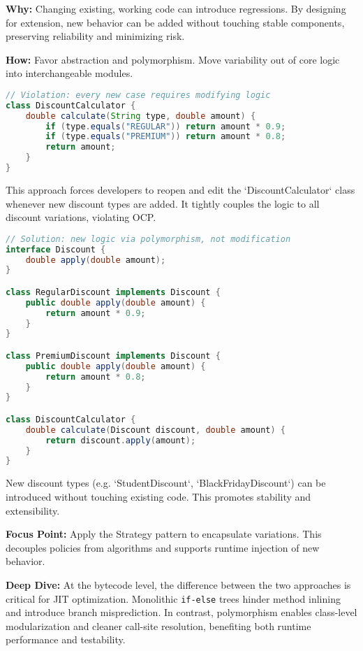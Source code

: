 \documentclass[a4paper,12pt]{article}
\begin{document}
\textbf{Why:} Changing existing, working code can introduce regressions. By designing for extension, new behavior can be added without touching stable components, preserving reliability and minimizing risk.

\textbf{How:} Favor abstraction and polymorphism. Move variability out of core logic into interchangeable modules.

\begin{lstlisting}[language=Java]
// Violation: every new case requires modifying logic
class DiscountCalculator {
    double calculate(String type, double amount) {
        if (type.equals("REGULAR")) return amount * 0.9;
        if (type.equals("PREMIUM")) return amount * 0.8;
        return amount;
    }
}
\end{lstlisting}

This approach forces developers to reopen and edit the `DiscountCalculator` class whenever new discount types are added. It tightly couples the logic to all discount variations, violating OCP.

\begin{lstlisting}[language=Java]
// Solution: new logic via polymorphism, not modification
interface Discount {
    double apply(double amount);
}

class RegularDiscount implements Discount {
    public double apply(double amount) {
        return amount * 0.9;
    }
}

class PremiumDiscount implements Discount {
    public double apply(double amount) {
        return amount * 0.8;
    }
}

class DiscountCalculator {
    double calculate(Discount discount, double amount) {
        return discount.apply(amount);
    }
}
\end{lstlisting}

New discount types (e.g. `StudentDiscount`, `BlackFridayDiscount`) can be introduced without touching existing code. This promotes stability and extensibility.

\textbf{Focus Point:} Apply the Strategy pattern to encapsulate variations. This decouples policies from algorithms and supports runtime injection of new behavior.

\textbf{Deep Dive:}  
At the bytecode level, the difference between the two approaches is critical for JIT optimization. Monolithic \texttt{if-else} trees hinder method inlining and introduce branch misprediction. In contrast, polymorphism enables class-level modularization and cleaner call-site resolution, benefiting both runtime performance and testability.
\end{document}
